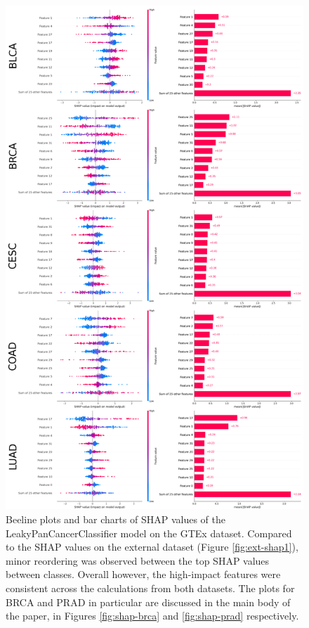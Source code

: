 \documentclass{l4proj}
\begin{document}
\begin{appendices}
\begin{figure}
    \centering
    \includegraphics[width=.85\linewidth]{images/gtex_shap1.png}
    \caption{Beeline plots and bar charts of SHAP values of the LeakyPanCancerClassifier model on the GTEx dataset. Compared to the SHAP values on the external dataset (Figure \ref{fig:ext-shap1}), minor reordering was observed between the top SHAP values between classes. Overall however, the high-impact features were consistent across the calculations from both datasets. The plots for BRCA and PRAD in particular are discussed in the main body of the paper, in Figures \ref{fig:shap-brca} and \ref{fig:shap-prad} respectively.}
    \label{fig:gtex-shap1}
\end{figure}


\end{appendices}
\end{document}
